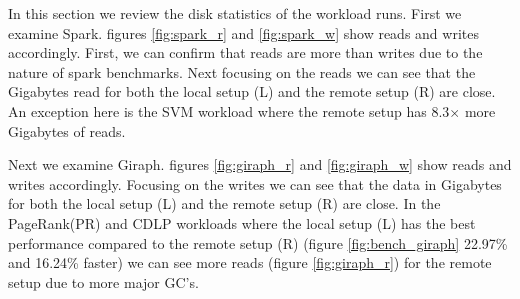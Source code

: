  In this section we review the disk statistics of the workload runs. First we
 examine Spark. figures \ref{fig:spark_r} and \ref{fig:spark_w} show reads and
 writes accordingly. First, we can confirm that reads are more than writes due to
 the nature of spark benchmarks. Next focusing on the reads we can see that the
 Gigabytes read for both the local setup (L) and the remote setup (R) are close.
 An exception here is the SVM workload where the remote setup has 8.3$\times$
 more Gigabytes of reads.
 
 Next we examine Giraph. figures \ref{fig:giraph_r} and \ref{fig:giraph_w} show
 reads and writes accordingly. Focusing on the writes we can see that the data
 in Gigabytes for both the local setup (L) and the remote setup (R) are close.
 In the PageRank(PR)	and CDLP workloads where the local setup (L) has the
 best performance compared to the remote setup (R) (figure
 \ref{fig:bench_giraph} 22.97\% and 16.24\% faster) we can see more reads
 (figure \ref{fig:giraph_r}) for the remote setup due to more major GC's.

